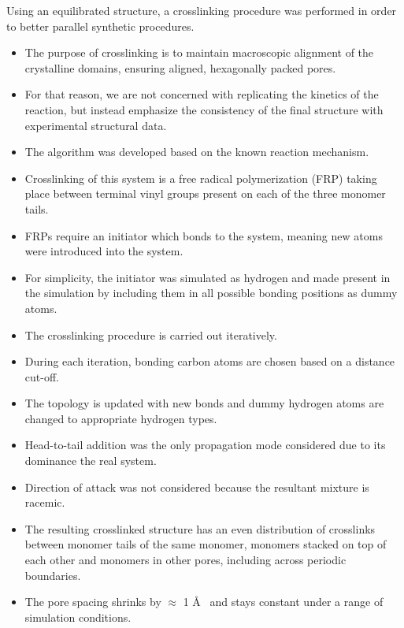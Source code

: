 \documentclass{article}
\newcommand{\angstrom}{\textup{\AA}}
\begin{document}
  Using an equilibrated structure, a crosslinking procedure was performed
  in order to better parallel synthetic procedures. 
  \begin{itemize}
    \item The purpose of crosslinking is to maintain macroscopic alignment of 
    the crystalline domains, ensuring aligned, hexagonally packed pores.
    \item For that reason, we are not concerned with replicating the kinetics 
    of the reaction, but instead emphasize the consistency of the final structure
    with experimental structural data.
    \item The algorithm was developed based on the known reaction mechanism.
    \item Crosslinking of this system is a free radical polymerization (FRP)
    taking place between terminal vinyl groups present on each of the three
    monomer tails.
    \item FRPs require an initiator which bonds to the system, meaning new atoms
    were introduced into the system.
    \item For simplicity, the initiator was simulated as hydrogen and made present 
    in the simulation by including them in all possible bonding positions as dummy atoms.
    \item The crosslinking procedure is carried out iteratively.
    \item During each iteration, bonding carbon atoms are chosen based on a distance cut-off.
    \item The topology is updated with new bonds and dummy hydrogen atoms are 
    changed to appropriate hydrogen types. 
    \item Head-to-tail addition was the only propagation mode considered due to 
    its dominance the real system.
    \item Direction of attack was not considered because the resultant mixture 
    is racemic.
    \item The resulting crosslinked structure has an even distribution of
    crosslinks between monomer tails of the same monomer, monomers stacked on
    top of each other and monomers in other pores, including across periodic
    boundaries.
    \item The pore spacing shrinks by $\approx$ 1 \angstrom~ and stays 
    constant under a range of simulation conditions.
  \end{itemize}
  
\end{document}
